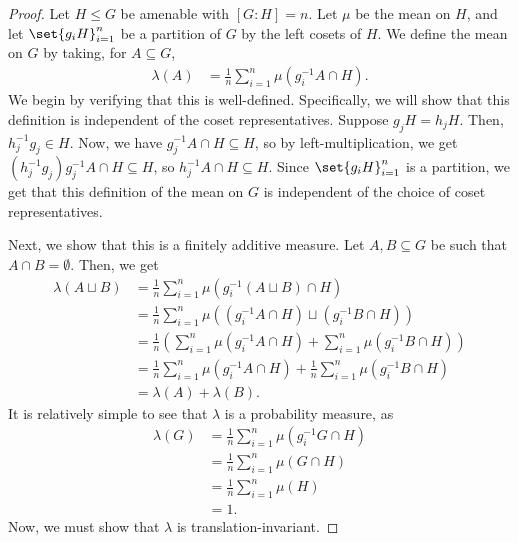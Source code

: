 \documentclass[10pt]{mypackage2}
\begin{document}
\begin{proof}
  Let $H\leq G$ be amenable with $\left[G:H\right] = n$. Let $\mu$ be the mean on $H$, and let $\set{g_iH}_{i=1}^{n}$ be a partition of $G$ by the left cosets of $H$. We define the mean on $G$ by taking, for $A\subseteq G$,
  \begin{align*}
    \lambda\left(A\right) &= \frac{1}{n}\sum_{i=1}^{n}\mu\left(g_i^{-1}A\cap H\right).
  \end{align*}
  We begin by verifying that this is well-defined. Specifically, we will show that this definition is independent of the coset representatives. Suppose $g_jH = h_j H$. Then, $h_j^{-1}g_j \in H$. Now, we have $g_j^{-1}A \cap H \subseteq H$, so by left-multiplication, we get $\left(h_j^{-1}g_j\right)g_j^{-1}A\cap H \subseteq H$, so $h_j^{-1}A\cap H\subseteq H$. Since $\set{g_i H}_{i=1}^{n}$ is a partition, we get that this definition of the mean on $G$ is independent of the choice of coset representatives.\newline

  Next, we show that this is a finitely additive measure. Let $A,B\subseteq G$ be such that $A\cap B = \emptyset$. Then, we get
  \begin{align*}
    \lambda\left(A\sqcup B\right) &= \frac{1}{n}\sum_{i=1}^{n}\mu\left(g_i^{-1}\left(A\sqcup B\right)\cap H\right)\\
                                  &= \frac{1}{n}\sum_{i=1}^{n}\mu\left(\left(g_i^{-1}A\cap H\right)\sqcup \left(g_i^{-1}B\cap H\right)\right)\\
                                  &= \frac{1}{n}\left(\sum_{i=1}^{n}\mu\left(g_i^{-1}A\cap H\right) + \sum_{i=1}^{n}\mu\left(g_i^{-1}B\cap H\right)\right)\\
                                  &= \frac{1}{n}\sum_{i=1}^{n}\mu\left(g_i^{-1}A\cap H\right) + \frac{1}{n}\sum_{i=1}^{n}\mu\left(g_i^{-1}B\cap H\right)\\
                                  &= \lambda\left(A\right) + \lambda\left(B\right).
  \end{align*}
  It is relatively simple to see that $\lambda$ is a probability measure, as
  \begin{align*}
    \lambda\left(G\right) &= \frac{1}{n}\sum_{i=1}^{n}\mu\left(g_i^{-1}G\cap H\right)\\
                          &= \frac{1}{n}\sum_{i=1}^{n}\mu\left(G\cap H\right)\\
                          &= \frac{1}{n}\sum_{i=1}^{n}\mu\left(H\right)\\
                          &= 1.
  \end{align*}
  Now, we must show that $\lambda$ is translation-invariant.\newline


\end{proof}
\end{document}
